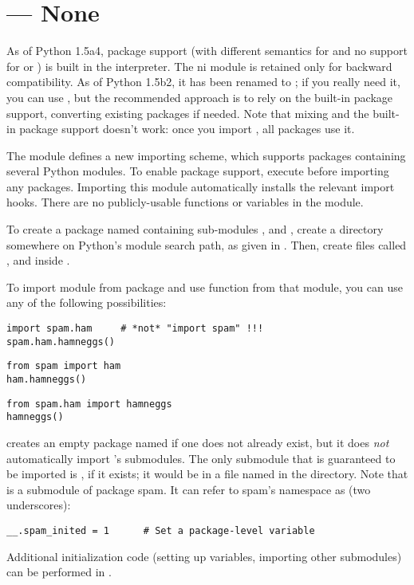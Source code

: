 \section{ ---
         None}



  As of Python 1.5a4,
package support (with different semantics for  and no
support for  or \code{__}) is built in the
interpreter.  The ni module is retained only for backward
compatibility.  As of Python 1.5b2, it has been renamed to ; 
if you really need it, you can use , but the
recommended approach is to rely on the built-in package support,
converting existing packages if needed.  Note that mixing 
and the built-in package support doesn't work: once you import
, all packages use it.

The  module defines a new importing scheme, which supports
packages containing several Python modules.  To enable package
support, execute  before importing any packages.  Importing
this module automatically installs the relevant import hooks.  There
are no publicly-usable functions or variables in the  module.

To create a package named  containing sub-modules ,  and
, create a directory  somewhere on Python's module search
path, as given in .  Then, create files called ,  and
 inside .

To import module  from package  and use function
 from that module, you can use any of the following
possibilities:

\begin{verbatim}
import spam.ham		# *not* "import spam" !!!
spam.ham.hamneggs()
\end{verbatim}
%
\begin{verbatim}
from spam import ham
ham.hamneggs()
\end{verbatim}
%
\begin{verbatim}
from spam.ham import hamneggs
hamneggs()
\end{verbatim}
%
 creates an
empty package named  if one does not already exist, but it does
\emph{not} automatically import 's submodules.  
The only submodule that is guaranteed to be imported is
, if it exists; it would be in a file named
 in the  directory.  Note that
 is a submodule of package spam.  It can refer to
spam's namespace as \code{__} (two underscores):

\begin{verbatim}
__.spam_inited = 1		# Set a package-level variable
\end{verbatim}
%
Additional initialization code (setting up variables, importing other
submodules) can be performed in .
